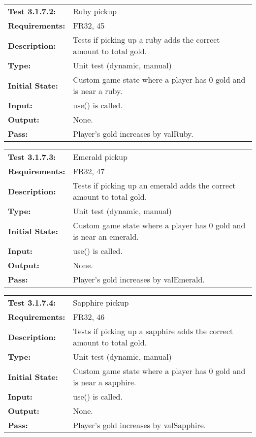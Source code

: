 \documentclass[12pt, titlepage]{article}
\begin{document}
\begin{tabular}{|l|p{10cm}|}
    \hline
    \bf{Test} 3.1.7.2: & Ruby pickup \\
    \bf{Requirements}: & FR32, 45 \\
    \bf{Description}: & Tests if picking up a ruby adds the correct amount to total gold. \\
    \bf{Type}: & Unit test (dynamic, manual) \\
    \bf{Initial State}: & Custom game state where a player has $0$ gold and is near a ruby. \\
    \bf{Input}: & use() is called. \\
    \bf{Output}: & None. \\
    \bf{Pass}: & Player's gold increases by valRuby. \\
    \hline
\end{tabular}

\textcolor{red}{
\begin{tabular}{|l|p{10cm}|}
    \hline
    \bf{Test} 3.1.7.3: & Emerald pickup \\
    \bf{Requirements}: & FR32, 47 \\
    \bf{Description}: & Tests if picking up an emerald adds the correct amount to total gold. \\
    \bf{Type}: & Unit test (dynamic, manual) \\
    \bf{Initial State}: & Custom game state where a player has $0$ gold and is near an emerald. \\
    \bf{Input}: & use() is called. \\
    \bf{Output}: & None. \\
    \bf{Pass}: & Player's gold increases by valEmerald. \\
    \hline
\end{tabular}
}

\textcolor{red}{
\begin{tabular}{|l|p{10cm}|}
    \hline
    \bf{Test} 3.1.7.4: & Sapphire pickup \\
    \bf{Requirements}: & FR32, 46 \\
    \bf{Description}: & Tests if picking up a sapphire adds the correct amount to total gold. \\
    \bf{Type}: & Unit test (dynamic, manual) \\
    \bf{Initial State}: & Custom game state where a player has $0$ gold and is near a sapphire. \\
    \bf{Input}: & use() is called. \\
    \bf{Output}: & None. \\
    \bf{Pass}: & Player's gold increases by valSapphire. \\
    \hline
\end{tabular}
}
\end{document}
